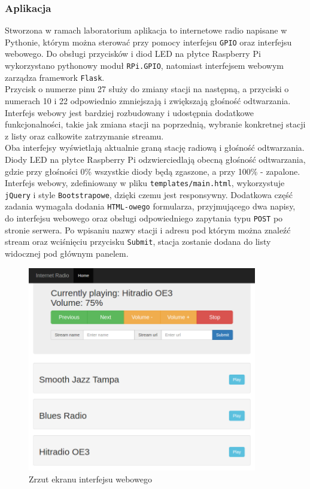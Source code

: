 \documentclass[10pt,a4paper]{article}
\begin{document}
\subsubsection{Aplikacja}
Stworzona w ramach laboratorium aplikacja to internetowe radio napisane w Pythonie, którym można sterować przy pomocy interfejsu \texttt{GPIO} oraz interfejsu webowego. Do obsługi przycisków i diod LED na płytce Raspberry Pi wykorzystano pythonowy moduł \texttt{RPi.GPIO}, natomiast interfejsem webowym zarządza framework \texttt{Flask}.\\[\baselineskip]
Przycisk o numerze pinu 27 służy do zmiany stacji na następną, a przyciski o numerach 10 i 22 odpowiednio zmniejszają i zwiększają głośność odtwarzania. Interfejs webowy jest bardziej rozbudowany i udostępnia dodatkowe funkcjonalności, takie jak zmiana stacji na poprzednią, wybranie konkretnej stacji z listy oraz całkowite zatrzymanie streamu.\\[\baselineskip]
Oba interfejsy wyświetlają aktualnie graną stację radiową i głośność odtwarzania. Diody LED na płytce Raspberry Pi odzwierciedlają obecną głośność odtwarzania, gdzie przy głośności 0\% wszystkie diody będą zgaszone, a przy 100\% - zapalone.\\[\baselineskip]
Interfejs webowy, zdefiniowany w pliku \texttt{templates/main.html}, wykorzystuje \texttt{jQuery} i style \texttt{Bootstrapowe}, dzięki czemu jest responsywny. Dodatkowa część zadania wymagała dodania \texttt{HTML-owego} formularza, przyjmującego dwa napisy, do interfejsu webowego oraz obsługi odpowiedniego zapytania typu \texttt{POST} po stronie serwera. Po wpisaniu nazwy stacji i adresu pod którym można znaleźć stream oraz wciśnięciu przycisku \texttt{Submit}, stacja zostanie dodana do listy widocznej pod głównym panelem.
\begin{figure}[H]
	\centering
	\includegraphics[width=10cm]{web-ui.png}
	\caption{Zrzut ekranu interfejsu webowego}
\end{figure}
\end{document}
